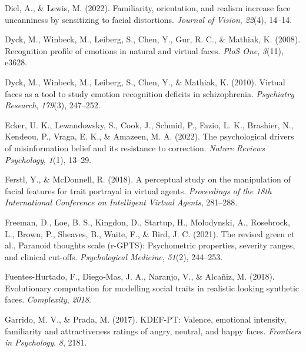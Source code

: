 \documentclass[
  man,floatsintext]{apa6}
\newlength{\cslhangindent}
\newlength{\cslentryspacingunit} %
\newenvironment{CSLReferences}[2] %
 {%
  \setlength{\parindent}{0pt}
  \ifodd #1
  \let\oldpar\par
  \def\par{\hangindent=\cslhangindent\oldpar}
  \fi
  \setlength{\parskip}{#2\cslentryspacingunit}
 }%
 {}
\begin{document}
\begin{CSLReferences}{1}{0}
\leavevmode{}%
Diel, A., \& Lewis, M. (2022). Familiarity, orientation, and realism increase face uncanniness by sensitizing to facial distortions. \emph{Journal of Vision}, \emph{22}(4), 14--14.

\leavevmode{}%
Dyck, M., Winbeck, M., Leiberg, S., Chen, Y., Gur, R. C., \& Mathiak, K. (2008). Recognition profile of emotions in natural and virtual faces. \emph{PloS One}, \emph{3}(11), e3628.

\leavevmode{}%
Dyck, M., Winbeck, M., Leiberg, S., Chen, Y., \& Mathiak, K. (2010). Virtual faces as a tool to study emotion recognition deficits in schizophrenia. \emph{Psychiatry Research}, \emph{179}(3), 247--252.

\leavevmode{}%
Ecker, U. K., Lewandowsky, S., Cook, J., Schmid, P., Fazio, L. K., Brashier, N., Kendeou, P., Vraga, E. K., \& Amazeen, M. A. (2022). The psychological drivers of misinformation belief and its resistance to correction. \emph{Nature Reviews Psychology}, \emph{1}(1), 13--29.

\leavevmode{}%
Ferstl, Y., \& McDonnell, R. (2018). A perceptual study on the manipulation of facial features for trait portrayal in virtual agents. \emph{Proceedings of the 18th International Conference on Intelligent Virtual Agents}, 281--288.

\leavevmode{}%
Freeman, D., Loe, B. S., Kingdon, D., Startup, H., Molodynski, A., Rosebrock, L., Brown, P., Sheaves, B., Waite, F., \& Bird, J. C. (2021). The revised green et al., Paranoid thoughts scale (r-GPTS): Psychometric properties, severity ranges, and clinical cut-offs. \emph{Psychological Medicine}, \emph{51}(2), 244--253.

\leavevmode{}%
Fuentes-Hurtado, F., Diego-Mas, J. A., Naranjo, V., \& Alcañiz, M. (2018). Evolutionary computation for modelling social traits in realistic looking synthetic faces. \emph{Complexity}, \emph{2018}.

\leavevmode{}%
Garrido, M. V., \& Prada, M. (2017). KDEF-PT: Valence, emotional intensity, familiarity and attractiveness ratings of angry, neutral, and happy faces. \emph{Frontiers in Psychology}, \emph{8}, 2181.


\end{CSLReferences}
\end{document}

